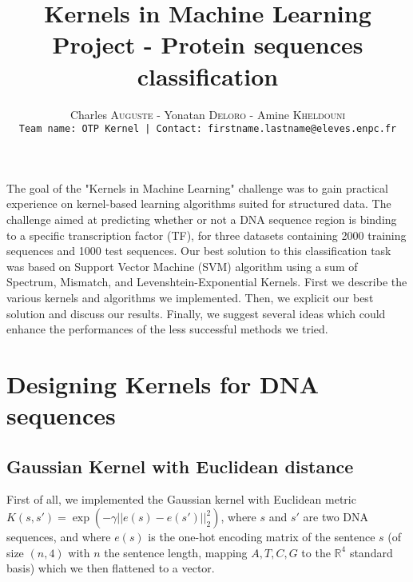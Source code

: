 \documentclass[11pt,twocolumn,letterpaper]{article}
\date{}
\begin{document}
\title{\textbf{Kernels in Machine Learning Project - Protein sequences classification}\vspace{-0.5ex}}

\author{Charles \textsc{Auguste}  -  Yonatan \textsc{Deloro}  -  Amine \textsc{Kheldouni} \\
{\tt\small Team name: OTP Kernel | Contact: firstname.lastname@eleves.enpc.fr}
\vspace{-4ex}}


\maketitle


The goal of the "Kernels in Machine Learning" challenge was to gain practical experience on kernel-based learning algorithms suited for structured data. The challenge aimed at predicting whether or not a DNA sequence region is binding to a specific transcription factor (TF), for three datasets containing 2000 training sequences and 1000 test sequences. Our best solution to this classification task was based on Support Vector Machine (SVM) algorithm using a sum of Spectrum, Mismatch, and Levenshtein-Exponential Kernels. First we describe the various kernels and algorithms we implemented. Then, we explicit our best solution and discuss our results. Finally, we suggest several ideas which could enhance the performances of the less successful methods we tried.


\section{Designing Kernels for DNA sequences}

\subsection{Gaussian Kernel with Euclidean distance}

First of all, we implemented the Gaussian kernel with Euclidean metric $K(s,s') = \exp (- \gamma  ||e(s) - e(s')||_2^2)$, where $s$ and $s'$ are two DNA sequences, and where $e(s)$ is the one-hot encoding matrix of the sentence $s$ (of size $(n,4)$ with $n$ the sentence length, mapping $A,T,C,G$ to the $\mathbb{R}^4$ standard basis) which we then flattened to a vector.
\end{document}
